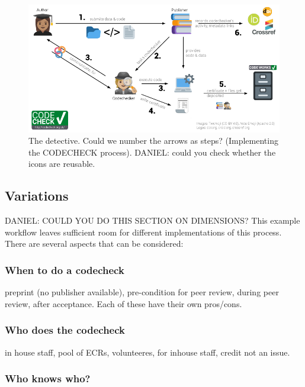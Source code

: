 \documentclass[12pt]{article}
\begin{document}
\begin{figure}
  \centering
      \includegraphics{figs/codecheck_overview.pdf}
  \caption{The detective. Could we number the arrows as steps?
(Implementing the CODECHECK process).  DANIEL: could you check whether
the icons are reusable.}
  \label{fig:worfklow}
\end{figure}

\subsection*{Variations}\label{variations}

DANIEL: COULD YOU DO THIS SECTION ON DIMENSIONS?
This example workflow leaves sufficient room for different
implementations of this process. There are several aspects that can be
considered:

\subsubsection*{When to do a codecheck}\label{when-to-do-a-codecheck}

preprint (no publisher available), pre-condition for peer review, during
peer review, after acceptance. Each of these have their own pros/cons.

\subsubsection*{Who does the codecheck}\label{who-does-the-codecheck}

in house staff, pool of ECRs, volunteeres, for inhouse staff, credit not
an issue.

\subsubsection*{Who knows who?}\label{who-knows-who}
\end{document}
